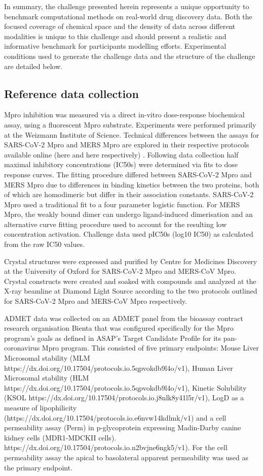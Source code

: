 \documentclass[journal=jacsat,manuscript=article]{achemso}
\begin{document}
In summary, the challenge presented herein represents a unique opportunity to benchmark computational methods on real-world drug discovery data. Both the focused coverage of chemical space and the density of data across different modalities is unique to this challenge and should present a realistic and informative benchmark for participants modelling efforts. Experimental conditions used to generate the challenge data and the structure of the challenge are detailed below.


\subsection{Reference data collection}

Mpro inhibition was measured via a direct in-vitro dose-response biochemical assay, using a fluorescent Mpro substrate. Experiments were performed primarily at the Weizmann Institute of Science. Technical differences between the assays for SARS-CoV-2 Mpro and MERS Mpro are explored in their respective protocols available online (here and here respectively) . Following data collection half maximal inhibitory concentrations (IC50s) were determined via fits to dose response curves.  The fitting procedure differed between SARS-CoV-2 Mpro and MERS Mpro due to differences in binding kinetics between the two proteins, both of which are homodimeric but differ in their association constants. SARS-CoV-2 Mpro used a traditional fit to a four parameter logistic function. For MERS Mpro, the weakly bound dimer can undergo ligand-induced dimerisation and an alternative curve fitting procedure used to account for the resulting low concentration activation. Challenge data used pIC50s (log10 IC50) as calculated from the raw IC50 values.

Crystal structures were expressed and purified by Centre for Medicines Discovery at the University of Oxford for SARS-CoV-2 Mpro and  MERS-CoV Mpro. Crystal constructs were created and soaked with compounds and analyzed at the X-ray beamline at Diamond Light Source according to the two protocols outlined for SARS-CoV-2 Mpro and MERS-CoV Mpro respectively. 

ADMET data was collected on an ADMET panel from the bioassay contract research organisation Bienta that was configured specifically for the Mpro program’s goals as defined in ASAP’s Target Candidate Profile for its pan-coronavirus Mpro program. This consisted of five primary endpoints: Mouse Liver Microsomal stability (MLM https://dx.doi.org/10.17504/protocols.io.5qpvokdb9l4o/v1), Human Liver Microsomal stability (HLM https://dx.doi.org/10.17504/protocols.io.5qpvokdb9l4o/v1), Kinetic Solubility (KSOL https://dx.doi.org/10.17504/protocols.io.j8nlk8y41l5r/v1), LogD as a measure of lipophilicity (https://dx.doi.org/10.17504/protocols.io.e6nvw14kdlmk/v1) and a cell permeability assay (Perm) in p-glycoprotein expressing Madin-Darby canine kidney cells (MDR1-MDCKII cells). https://dx.doi.org/10.17504/protocols.io.n2bvjne6ngk5/v1).  For the cell permeability assay the apical to basolateral apparent permeability was used as the primary endpoint.
\end{document}
